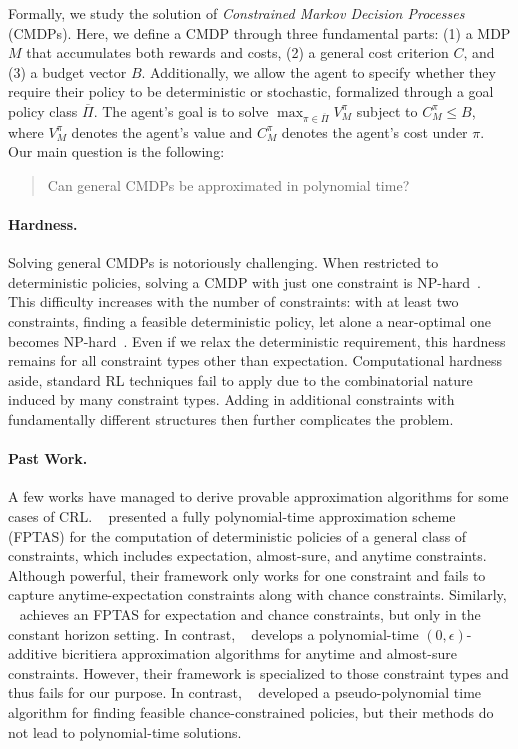 \documentclass[pdftex, a4paper, 12pt]{article}
\newcommand{\jeremy}[1]{\textcolor{red}{#1}}
\newcommand{\gPi}{\overline{\Pi}}
\begin{document}
Formally, we study the solution of \emph{Constrained Markov Decision Processes} (CMDPs). Here, we define a CMDP through three fundamental parts: (1) a MDP $M$ that accumulates both rewards and costs, (2) a general cost criterion $C$, and (3) a budget vector $B$. Additionally, we allow the agent to specify whether they require their policy to be deterministic or stochastic, formalized through a goal policy class $\gPi$. The agent's goal is to solve $\max_{\pi \in \gPi} V^{\pi}_M$ subject to $C_M^{\pi} \leq B$, where $V^{\pi}_M$ denotes the agent's value and $C^{\pi}_M$ denotes the agent's cost under $\pi$. Our main question is the following:

\begin{quote}
    Can general CMDPs be approximated in polynomial time? 
\end{quote}

\paragraph{Hardness.} Solving general CMDPs is notoriously challenging. When restricted to deterministic policies, solving a CMDP with just one constraint is NP-hard~\cite{cMDP-hardness-OG, CCMDP-GoalComplexity,acRL, dcRL}. This difficulty increases with the number of constraints: with at least two constraints, finding a feasible deterministic policy, let alone a near-optimal one becomes NP-hard~\cite{acRL}. Even if we relax the deterministic requirement, this hardness remains for all constraint types other than expectation. Computational hardness aside, standard RL techniques fail to apply due to the combinatorial nature induced by many constraint types. Adding in additional constraints with fundamentally different structures then further complicates the problem.   

\paragraph{Past Work.} A few works have managed to derive provable approximation algorithms for some cases of CRL. ~\citet{dcRL} presented a fully polynomial-time approximation scheme (FPTAS) for the computation of deterministic policies of a general class of constraints, which includes expectation, almost-sure, and anytime constraints. Although powerful, their framework only works for one constraint and fails to capture anytime-expectation constraints along with chance constraints. Similarly, ~\citet{cMDP-deterministic-constH} achieves an FPTAS for expectation and chance constraints, but only in the constant horizon setting.
In contrast, ~\citet{acRL} develops a polynomial-time $(0,\epsilon)$-additive bicritiera approximation algorithms for anytime and almost-sure constraints. However, their framework is specialized to those constraint types and thus fails for our purpose. In contrast, ~\citet{CCMDP-GoalComplexity} developed a pseudo-polynomial time algorithm for finding feasible chance-constrained policies, but their methods do not lead to polynomial-time solutions. 
\end{document}
